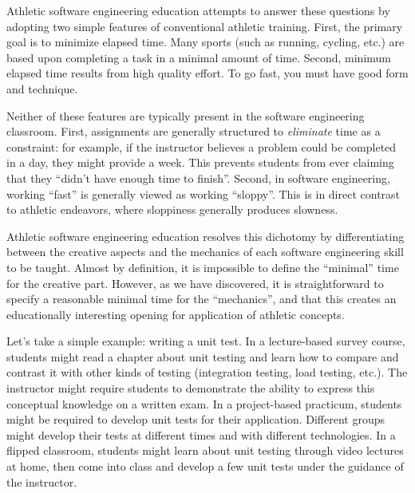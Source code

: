 
Athletic software engineering education attempts to answer these questions by adopting two simple features of conventional athletic training. First, the primary goal is to minimize elapsed time.  Many sports (such as running, cycling, etc.) are based upon completing a task in a minimal amount of time.  Second, minimum elapsed time results from high quality effort. To go fast, you must have good form and technique. 

Neither of these features are typically present in the software engineering classroom. First, assignments are generally structured to {\em eliminate} time as a constraint: for example, if the instructor believes a problem could be completed in a day, they might provide a week.  This prevents students from ever claiming that they ``didn't have enough time to finish''.  Second, in software engineering, working ``fast'' is generally viewed as working ``sloppy''.  This is in direct contrast to athletic endeavors, where sloppiness generally produces slowness.

Athletic software engineering education resolves this dichotomy by differentiating between the creative aspects and the mechanics of each software engineering skill to be taught. Almost by definition, it is impossible to define the ``minimal'' time for the creative part. However, as we have discovered, it is straightforward to specify a reasonable minimal time for the ``mechanics'', and that this creates an educationally interesting opening for application of athletic concepts. 

Let's take a simple example: writing a unit test.  In a lecture-based survey course, students might read a chapter about unit testing and learn how to compare and contrast it with other kinds of testing (integration testing, load testing, etc.). The instructor might require students to demonstrate the ability to express this conceptual knowledge on a written exam.  
%
In a project-based practicum, students might be required to develop unit tests for their application. Different groups might develop their tests at different times and with different technologies. 
%
In a flipped classroom, students might learn about unit testing through video lectures at home, then come into class and develop a few unit tests under the guidance of the instructor. 

